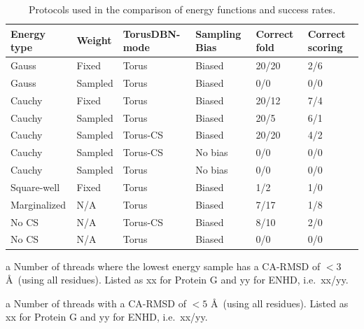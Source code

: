 \begin{table}[h]
    \caption{Protocols used in the comparison of energy functions and success rates.}
    \begin{center}
    \begin{threeparttable}
    \begin{tabular}{l l l l l l}
Energy type & Weight  & TorusDBN-mode & Sampling Bias & Correct fold\tnote{a} & Correct scoring\\\hline
Gauss       & Fixed   & Torus       & Biased   & 20/20  & 2/6  \\ 
Gauss       & Sampled & Torus       & Biased   &  0/0   & 0/0  \\ 
Cauchy      & Fixed   & Torus       & Biased   & 20/12  & 7/4  \\ 
Cauchy      & Sampled & Torus       & Biased   & 20/5   & 6/1  \\ 
Cauchy      & Sampled & Torus-CS    & Biased   & 20/20  & 4/2  \\ 
Cauchy      & Sampled & Torus-CS    & No bias  &  0/0   & 0/0  \\ 
Cauchy      & Sampled & Torus       & No bias  &  0/0   & 0/0  \\ 
Square-well & Fixed   & Torus       & Biased   &  1/2   & 1/0  \\ 
Marginalized & N/A    & Torus       & Biased   &  7/17  & 1/8  \\ 
No CS       & N/A     & Torus-CS    & Biased   &  8/10  & 2/0  \\ 
No CS       & N/A     & Torus       & Biased   &  0/0   & 0/0  \\ 
    \end{tabular}
    \begin{tablenotes}
        \item[a] Number of threads where the lowest energy sample has a CA-RMSD of $<3$ \AA\ (using all residues). Listed as xx for Protein G and yy for ENHD, i.e.~xx/yy.\\
        \item[a] Number of threads with a CA-RMSD of $<5$ \AA\ (using all residues). Listed as xx for Protein G and yy for ENHD, i.e.~xx/yy.\\
    \end{tablenotes}
    \end{threeparttable}
    \end{center}
    \label{tab:prior_folds}
\end{table}




